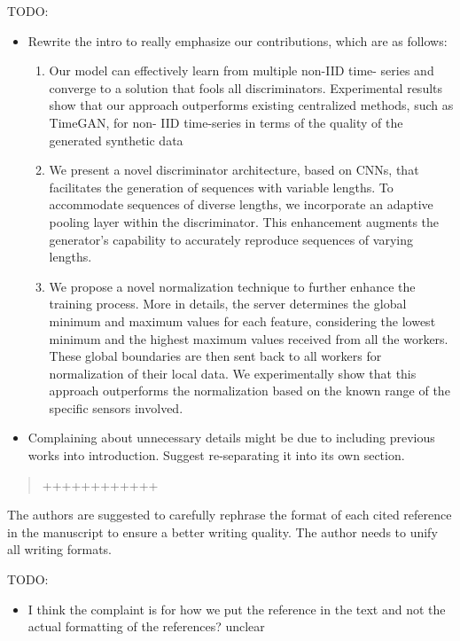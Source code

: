 \documentclass{article}
\begin{document}
\AR TODO: 
\begin{itemize}
    \item Rewrite the intro to really emphasize our contributions, which are as follows:
    \begin{enumerate}
        \item Our model can effectively learn from multiple non-IID time- series and converge to a solution that fools all discriminators. Experimental results show that our approach outperforms existing centralized methods, such as TimeGAN, for non- IID time-series in terms of the quality of the generated synthetic data  
        \item We present a novel discriminator architecture, based on CNNs, that facilitates the generation of sequences with variable lengths. To accommodate sequences of diverse lengths, we incorporate an adaptive pooling layer within the discriminator. This enhancement augments the generator's capability to accurately reproduce sequences of varying lengths.
        \item We propose a novel normalization technique to further enhance the training process. More in details, the server determines the global minimum and maximum values for each feature, considering the lowest minimum and the highest maximum values received from all the workers. These global boundaries are then sent back to all workers for normalization of their local data. We experimentally show that this approach outperforms the normalization based on the known range of the specific sensors involved.
        \end{enumerate}
    \item Complaining about unnecessary details might be due to including previous works into introduction. Suggest re-separating it into its own section.
\end{itemize}

\begin{quote}
	++++++++++++
\end{quote}

\RC The authors are suggested to carefully rephrase the format of each cited reference in the manuscript to ensure a better writing quality. The author needs to unify all writing formats.

\AR TODO: 
\begin{itemize}
    \item I think the complaint is for how we put the reference in the text and not the actual formatting of the references? unclear
\end{itemize}
\end{document}
